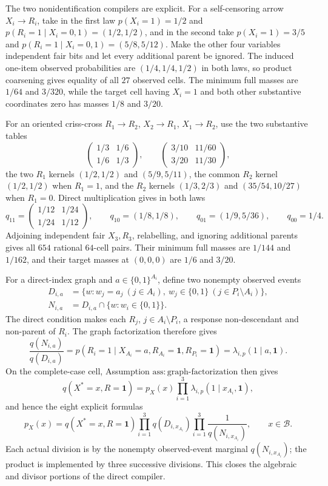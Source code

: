 The two nonidentification compilers are explicit. For a self-censoring arrow \(X_i\to R_i\), take in the first law \(p(X_i=1)=1/2\) and \(p(R_i=1\mid X_i=0,1)=(1/2,1/2)\), and in the second take \(p(X_i=1)=3/5\) and \(p(R_i=1\mid X_i=0,1)=(5/8,5/12)\). Make the other four variables independent fair bits and let every additional parent be ignored. The induced one-item observed probabilities are \((1/4,1/4,1/2)\) in both laws, so product coarsening gives equality of all \(27\) observed cells. The minimum full masses are \(1/64\) and \(3/320\), while the target cell having \(X_i=1\) and both other substantive coordinates zero has masses \(1/8\) and \(3/20\).

For an oriented criss-cross \(R_1\to R_2\), \(X_2\to R_1\), \(X_1\to R_2\), use the two substantive tables
\[
\begin{pmatrix}1/3&1/6\\1/6&1/3\end{pmatrix},
\qquad
\begin{pmatrix}3/10&11/60\\3/20&11/30\end{pmatrix},
\]
the two \(R_1\) kernels \((1/2,1/2)\) and \((5/9,5/11)\), the common \(R_2\) kernel \((1/2,1/2)\) when \(R_1=1\), and the \(R_2\) kernels \((1/3,2/3)\) and \((35/54,10/27)\) when \(R_1=0\). Direct multiplication gives in both laws
\[
q_{11}=\begin{pmatrix}1/12&1/24\\1/24&1/12\end{pmatrix},\qquad
q_{10}=(1/8,1/8),\qquad q_{01}=(1/9,5/36),\qquad q_{00}=1/4.
\]
Adjoining independent fair \(X_3,R_3\), relabelling, and ignoring additional parents gives all \(654\) rational \(64\)-cell pairs. Their minimum full masses are \(1/144\) and \(1/162\), and their target masses at \((0,0,0)\) are \(1/6\) and \(3/20\).

For a direct-index graph and \(a\in\{0,1\}^{A_i}\), define two nonempty observed events
\[
\begin{split}
D_{i,a}&=\{w:w_j=a_j\ (j\in A_i),\ w_j\in\{0,1\}\ (j\in P_i\setminus A_i)\},\\
N_{i,a}&=D_{i,a}\cap\{w:w_i\in\{0,1\}\}.
\end{split}
\]
The direct condition makes each \(R_j\), \(j\in A_i\setminus P_i\), a response non-descendant and non-parent of \(R_i\). The graph factorization therefore gives
\[
\frac{q(N_{i,a})}{q(D_{i,a})}
=p(R_i=1\mid X_{A_i}=a,R_{A_i}=\mathbf1,R_{P_i}=\mathbf1)
=\lambda_{i,p}(1\mid a,\mathbf1).
\]
On the complete-case cell, Assumption \(\mathrm{ass{:}graph\text{-}factorization}\) then gives
\[
q(X^*=x,R=\mathbf1)
=p_X(x)\prod_{i=1}^{3}\lambda_{i,p}(1\mid x_{A_i},\mathbf1),
\]
and hence the eight explicit formulas
\[
p_X(x)=q(X^*=x,R=\mathbf1)
\prod_{i=1}^{3}q(D_{i,x_{A_i}})
\prod_{i=1}^{3}\frac{1}{q(N_{i,x_{A_i}})},
\qquad x\in\mathcal B.
\]
Each actual division is by the nonempty observed-event marginal \(q(N_{i,x_{A_i}})\); the product is implemented by three successive divisions. This closes the algebraic and divisor portions of the direct compiler.

